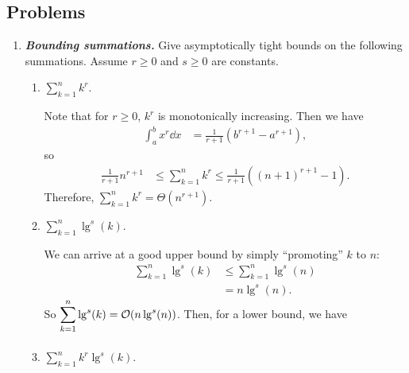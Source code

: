 \documentclass[AppendixA]{subfiles}
\begin{document}
	\subsection*{Problems}

	\begin{enumerate}[leftmargin=\labelsep,label={\textbf{\thesection-\arabic*}}]
		\item \textbf{\textit{Bounding summations.}} Give asymptotically tight bounds on the following summations. Assume $r \geq 0$ and $s \geq 0$ are constants.
		\begin{enumerate}
			\item $\displaystyle \sum_{k = 1}^n k^r$.
			\begin{answer}
				Note that for $r \geq 0$, $k^r$ is monotonically increasing. Then we have
				\begin{align*}
					\int_a^b x^r \dd x &= \frac{1}{r + 1}(b^{r + 1} - a^{r + 1}),
				\end{align*}
				so
				\begin{align*}
					\frac{1}{r + 1} n^{r + 1} &\leq \sum_{k = 1}^n k^r \leq \frac{1}{r + 1}((n + 1)^{r + 1} - 1).
				\end{align*}
				Therefore, $\displaystyle \sum_{k = 1}^n k^r = \Theta(n^{r + 1})$.
			\end{answer}

			\item $\displaystyle \sum_{k = 1}^n \lg^s(k)$.
			\begin{answer}
				We can arrive at a good upper bound by simply ``promoting'' $k$ to $n$:
				\begin{align*}
					\sum_{k = 1}^n \lg^s(k) &\leq \sum_{k = 1}^n \lg^s(n)\\
						&= n\lg^s(n).
				\end{align*}
				So $\displaystyle \sum_{k = 1}^n \lg^s(k) = \mathcal{O}(n\lg^s(n))$. Then, for a lower bound, we have
				\begin{align*}
					
				\end{align*}
			\end{answer}
			
			\item $\displaystyle \sum_{k = 1}^n k^r\lg^s(k)$.
			\begin{answer}
				
			\end{answer}
			
		\end{enumerate}
	\end{enumerate}
\end{document}
